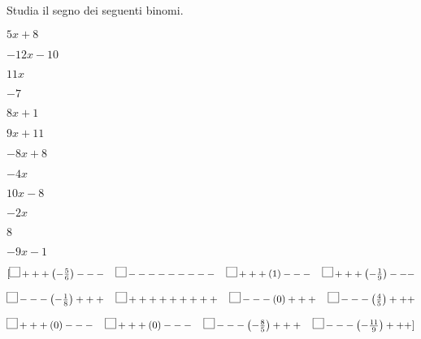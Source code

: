 \begin{esercizio}\label{ese:dis_4}
 Studia il segno dei seguenti binomi.
\begin{multicols}{4}
 \begin{enumeratea}
  \item  $5 x +8$
  \item  $-12 x -10$
  \item  $11 x$
  \item  $-7$
  \item  $8 x +1$
  \item  $9 x +11$
  \item  $-8 x +8$
  \item  $-4 x$
  \item  $10 x -8$
  \item  $-2 x $
  \item  $8$
  \item  $-9 x -1$
 \end{enumeratea}
\end{multicols}
\begin{flushright}
\vspace*{-8pt}
$[\framebox(10,10){}+++\left(-\frac{5}{6}\right)--- \quad 
  \framebox(10,10){}--------- \quad
  \framebox(10,10){}+++\left(1\right)--- \quad 
  \framebox(10,10){}+++\left(-\frac{1}{9}\right)--- $
  
$ \framebox(10,10){}---\left(-\frac{1}{8}\right)+++ \quad 
  \framebox(10,10){}+++++++++ \quad
  \framebox(10,10){}---\left(0\right)+++ \quad 
  \framebox(10,10){}---\left(\frac{4}{5}\right)+++ $
  
$ \framebox(10,10){}+++\left(0\right)--- \quad 
  \framebox(10,10){}+++\left(0\right)--- \quad
  \framebox(10,10){}---\left(-\frac{8}{5}\right)+++ \quad 
  \framebox(10,10){}---\left(-\frac{11}{9}\right)+++ ]$
\end{flushright}
\end{esercizio}

\subsubsection*{}


